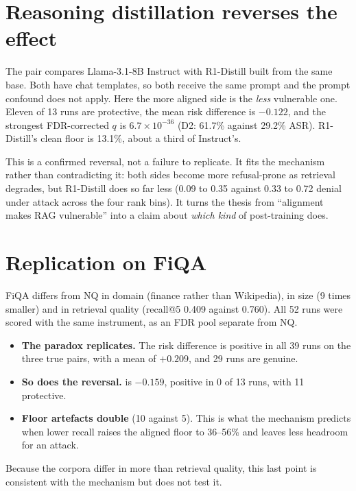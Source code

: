 \section{Reasoning distillation reverses the effect}
\label{sec:res-r1}

The  pair compares Llama-3.1-8B Instruct with R1-Distill
built from the same base. Both have chat templates, so both receive the same
prompt and the prompt confound does not apply. Here the more aligned side is
the \emph{less} vulnerable one. Eleven of 13 runs are protective, the mean risk
difference is $-0.122$, and the strongest FDR-corrected $q$ is
$6.7\times10^{-36}$ (D2: 61.7\% against 29.2\% ASR). R1-Distill's clean floor is
13.1\%, about a third of Instruct's.

This is a confirmed reversal, not a failure to replicate. It fits the mechanism
rather than contradicting it: both sides become more refusal-prone as retrieval
degrades, but R1-Distill does so far less (0.09 to 0.35 against 0.33 to 0.72
denial under attack across the four rank bins). It turns the thesis from
``alignment makes RAG vulnerable'' into a claim about \emph{which kind} of
post-training does. 

\section{Replication on FiQA}
\label{sec:res-fiqa}

FiQA differs from NQ in domain (finance rather than Wikipedia), in size (9
times smaller) and in retrieval quality (recall@5 0.409 against 0.760). All 52
runs were scored with the same instrument, as an FDR pool separate from NQ.

\begin{itemize}
  \item \textbf{The paradox replicates.} The risk difference is positive in all
    39 runs on the three true pairs, with a mean of $+0.209$, and 29 runs are
    genuine.
  \item \textbf{So does the reversal.}  is $-0.159$, positive
    in 0 of 13 runs, with 11 protective.
  \item \textbf{Floor artefacts double} (10 against 5). This is what the
    mechanism predicts when lower recall raises the aligned floor to 36--56\%
    and leaves less headroom for an attack.
\end{itemize}
Because the corpora differ in more than retrieval quality, this last point is
consistent with the mechanism but does not test it.

